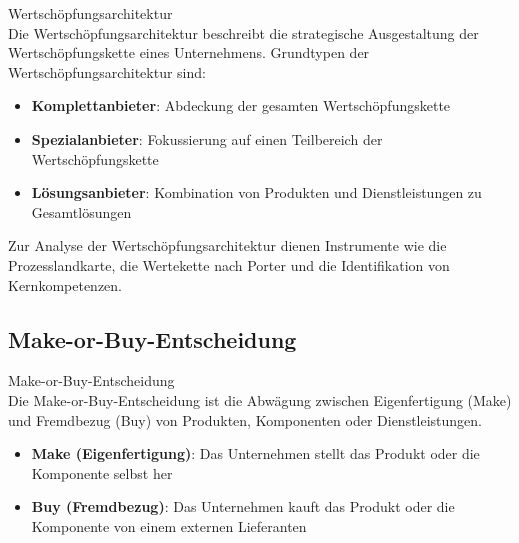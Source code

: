 \begin{concept}{Wertschöpfungsarchitektur}\\
Die Wertschöpfungsarchitektur beschreibt die strategische Ausgestaltung der Wertschöpfungskette eines Unternehmens. Grundtypen der Wertschöpfungsarchitektur sind:
\begin{itemize}
    \item \textbf{Komplettanbieter}: Abdeckung der gesamten Wertschöpfungskette
    \item \textbf{Spezialanbieter}: Fokussierung auf einen Teilbereich der Wertschöpfungskette
    \item \textbf{Lösungsanbieter}: Kombination von Produkten und Dienstleistungen zu Gesamtlösungen
\end{itemize}

Zur Analyse der Wertschöpfungsarchitektur dienen Instrumente wie die Prozesslandkarte, die Wertekette nach Porter und die Identifikation von Kernkompetenzen.
\end{concept}

\subsection{Make-or-Buy-Entscheidung}

\begin{definition}{Make-or-Buy-Entscheidung}\\
Die Make-or-Buy-Entscheidung ist die Abwägung zwischen Eigenfertigung (Make) und Fremdbezug (Buy) von Produkten, Komponenten oder Dienstleistungen.
\begin{itemize}
    \item \textbf{Make (Eigenfertigung)}: Das Unternehmen stellt das Produkt oder die Komponente selbst her
    \item \textbf{Buy (Fremdbezug)}: Das Unternehmen kauft das Produkt oder die Komponente von einem externen Lieferanten
\end{itemize}
\end{definition}

